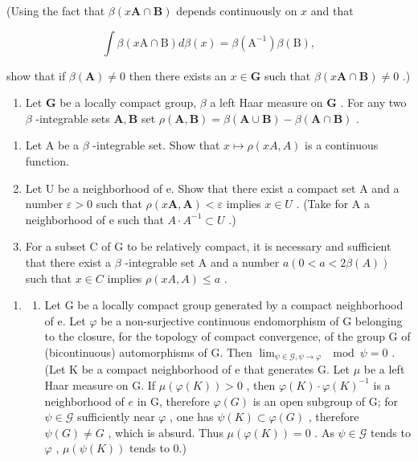 (Using the fact that \(\beta (x\mathbf{A}\cap \mathbf{B})\) depends continuously on \(x\) and that

\[
\int \beta (x \mathrm{A} \cap \mathrm{B}) d \beta (x) = \beta (\mathrm{A} ^ {- 1}) \beta (\mathrm{B}),
\]

show that if \(\beta (\mathbf{A})\neq 0\) then there exists an \(x\in \mathbf{G}\) such that \(\beta (x\mathbf{A}\cap \mathbf{B})\neq 0\) .)

\begin{enumerate}
\def\labelenumi{\arabic{enumi})}
\setcounter{enumi}{9}
\tightlist
\item
  Let \(\mathbf{G}\) be a locally compact group, \(\beta\) a left Haar measure on \(\mathbf{G}\) . For any two \(\beta\) -integrable sets \(\mathbf{A}, \mathbf{B}\) set \(\rho(\mathbf{A}, \mathbf{B}) = \beta(\mathbf{A} \cup \mathbf{B}) - \beta(\mathbf{A} \cap \mathbf{B})\) .
\end{enumerate}

\begin{enumerate}
\def\labelenumi{\alph{enumi})}
\item
  Let A be a \(\beta\) -integrable set. Show that \(x \mapsto \rho(xA, A)\) is a continuous function.
\item
  Let U be a neighborhood of e. Show that there exist a compact set A and a number \(\varepsilon > 0\) such that \(\rho(x\mathbf{A}, \mathbf{A}) < \varepsilon\) implies \(x \in U\) . (Take for A a neighborhood of e such that \(A \cdot A^{-1} \subset U\) .)
\item
  For a subset C of G to be relatively compact, it is necessary and sufficient that there exist a \(\beta\) -integrable set A and a number \(a (0 < a < 2\beta(A))\) such that \(x \in C\) implies \(\rho(xA, A) \leqslant a\) .
\end{enumerate}

\begin{enumerate}
\def\labelenumi{\arabic{enumi})}
\setcounter{enumi}{10}
\tightlist
\item
  \begin{enumerate}
  \def\labelenumii{\alph{enumii})}
  \tightlist
  \item
    Let G be a locally compact group generated by a compact neighborhood of e. Let \(\varphi\) be a non-surjective continuous endomorphism of G belonging to the closure, for the topology of compact convergence, of the group G of (bicontinuous) automorphisms of G. Then \(\lim_{\psi\in\mathcal{G},\psi\to\varphi}\mod\psi=0\) . (Let K be a compact neighborhood of e that generates G. Let \(\mu\) be a left Haar measure on G. If \(\mu(\varphi(K)) > 0\) , then \(\varphi(K) \cdot \varphi(K)^{-1}\) is a neighborhood of \(e\) in G, therefore \(\varphi(G)\) is an open subgroup of G; for \(\psi \in \mathcal{G}\) sufficiently near \(\varphi\) , one has \(\psi(K) \subset \varphi(G)\) , therefore \(\psi(G) \neq G\) , which is absurd. Thus \(\mu(\varphi(K)) = 0\) . As \(\psi \in \mathcal{G}\) tends to \(\varphi\) , \(\mu(\psi(K))\) tends to 0.)
  \end{enumerate}
\end{enumerate}

